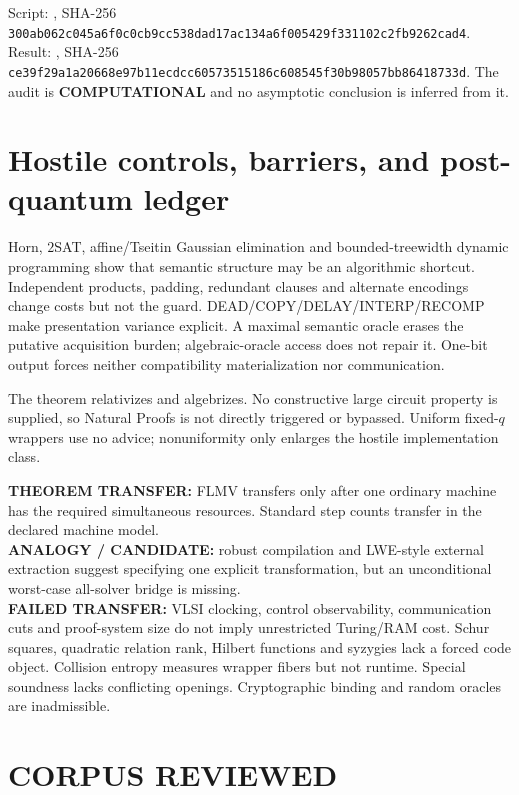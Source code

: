 \documentclass[11pt]{article}
\newcommand{\COMP}{\textbf{COMPUTATIONAL}}
\begin{document}
Script:
,
SHA-256
\nolinkurl{300ab062c045a6f0c0cb9cc538dad17ac134a6f005429f331102c2fb9262cad4}.
Result:
,
SHA-256
\nolinkurl{ce39f29a1a20668e97b11ecdcc60573515186c608545f30b98057bb86418733d}.
The audit is \COMP{} and no asymptotic conclusion is inferred from it.

\section{Hostile controls, barriers, and post-quantum ledger}

Horn, $2$SAT, affine/Tseitin Gaussian elimination and bounded-treewidth
dynamic programming show that semantic structure may be an algorithmic
shortcut.  Independent products, padding, redundant clauses and alternate
encodings change costs but not the guard.  DEAD/COPY/DELAY/INTERP/RECOMP make
presentation variance explicit.  A maximal semantic oracle erases the
putative acquisition burden; algebraic-oracle access does not repair it.
One-bit output forces neither compatibility materialization nor communication.

The theorem relativizes and algebrizes.  No constructive large circuit
property is supplied, so Natural Proofs is not directly triggered or bypassed.
Uniform fixed-$q$ wrappers use no advice; nonuniformity only enlarges the
hostile implementation class.

\textbf{THEOREM TRANSFER:} FLMV transfers only after one ordinary machine has
the required simultaneous resources.  Standard step counts transfer in the
declared machine model.\\
\textbf{ANALOGY / CANDIDATE:} robust compilation and LWE-style external
extraction suggest specifying one explicit transformation, but an
unconditional worst-case all-solver bridge is missing.\\
\textbf{FAILED TRANSFER:} VLSI clocking, control observability, communication
cuts and proof-system size do not imply unrestricted Turing/RAM cost.  Schur
squares, quadratic relation rank, Hilbert functions and syzygies lack a
forced code object.  Collision entropy measures wrapper fibers but not
runtime.  Special soundness lacks conflicting openings.  Cryptographic
binding and random oracles are inadmissible.

\section{CORPUS REVIEWED}
\end{document}
